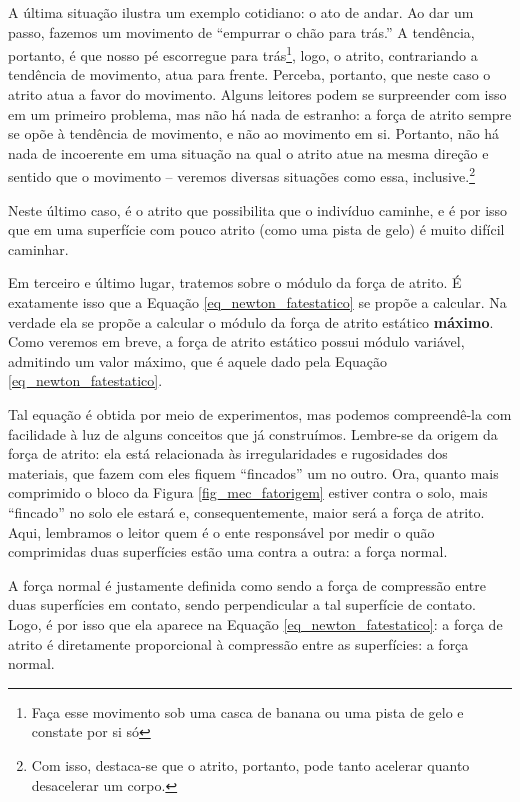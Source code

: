 A última situação ilustra um exemplo cotidiano: o ato de andar. Ao dar um passo, fazemos um movimento de ``empurrar o chão para trás.'' A tendência, portanto, é que nosso pé escorregue para trás\footnote{Faça esse movimento sob uma casca de banana ou uma pista de gelo e constate por si só}, logo, o atrito, contrariando a tendência de movimento, atua para frente. Perceba, portanto, que neste caso o atrito atua a favor do movimento. Alguns leitores podem se surpreender com isso em um primeiro problema, mas não há nada de estranho: a força de atrito sempre se opõe à tendência de movimento, e não ao movimento em si. Portanto, não há nada de incoerente em uma situação na qual o atrito atue na mesma direção e sentido que o movimento -- veremos diversas situações como essa, inclusive.\footnote{Com isso, destaca-se que o atrito, portanto, pode tanto acelerar quanto desacelerar um corpo.}

Neste último caso, é o atrito que possibilita que o indivíduo caminhe, e é por isso que em uma superfície com pouco atrito (como uma pista de gelo) é muito difícil caminhar.




Em terceiro e último lugar, tratemos sobre o módulo da força de atrito. É exatamente isso que a Equação \eqref{eq_newton_fatestatico} se propõe a calcular. Na verdade ela se propõe a calcular o módulo da força de atrito estático \textbf{máximo}. Como veremos em breve, a força de atrito estático possui módulo variável, admitindo um valor máximo, que é aquele dado pela Equação \eqref{eq_newton_fatestatico}.

Tal equação é obtida por meio de experimentos, mas podemos compreendê-la com facilidade à luz de alguns conceitos que já construímos. Lembre-se da origem da força de atrito: ela está relacionada às irregularidades e rugosidades dos materiais, que fazem com eles fiquem ``fincados'' um no outro. Ora, quanto mais comprimido o bloco da Figura \ref{fig_mec_fatorigem} estiver contra o solo, mais ``fincado'' no solo ele estará e, consequentemente, maior será a força de atrito. Aqui, lembramos o leitor quem é o ente responsável por medir o quão comprimidas duas superfícies estão uma contra a outra: a força normal. 

A força normal é justamente definida como sendo a força de compressão entre duas superfícies em contato, sendo perpendicular a tal superfície de contato. Logo, é por isso que ela aparece na Equação \eqref{eq_newton_fatestatico}: a força de atrito é diretamente proporcional à compressão entre as superfícies: a força normal.

